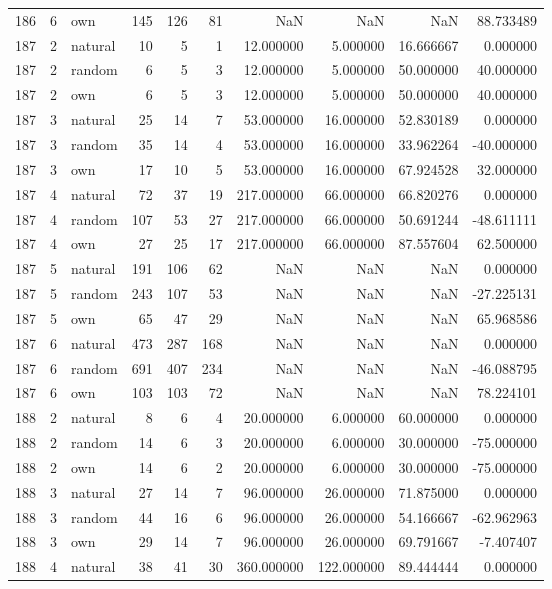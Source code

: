 \begin{table}[htbp]
\begin{tabular}{rrlrrrrrrr}
186 & 6 & own & 145 & 126 & 81 & NaN & NaN & NaN & 88.733489 \\
187 & 2 & natural & 10 & 5 & 1 & 12.000000 & 5.000000 & 16.666667 & 0.000000 \\
187 & 2 & random & 6 & 5 & 3 & 12.000000 & 5.000000 & 50.000000 & 40.000000 \\
187 & 2 & own & 6 & 5 & 3 & 12.000000 & 5.000000 & 50.000000 & 40.000000 \\
187 & 3 & natural & 25 & 14 & 7 & 53.000000 & 16.000000 & 52.830189 & 0.000000 \\
187 & 3 & random & 35 & 14 & 4 & 53.000000 & 16.000000 & 33.962264 & -40.000000 \\
187 & 3 & own & 17 & 10 & 5 & 53.000000 & 16.000000 & 67.924528 & 32.000000 \\
187 & 4 & natural & 72 & 37 & 19 & 217.000000 & 66.000000 & 66.820276 & 0.000000 \\
187 & 4 & random & 107 & 53 & 27 & 217.000000 & 66.000000 & 50.691244 & -48.611111 \\
187 & 4 & own & 27 & 25 & 17 & 217.000000 & 66.000000 & 87.557604 & 62.500000 \\
187 & 5 & natural & 191 & 106 & 62 & NaN & NaN & NaN & 0.000000 \\
187 & 5 & random & 243 & 107 & 53 & NaN & NaN & NaN & -27.225131 \\
187 & 5 & own & 65 & 47 & 29 & NaN & NaN & NaN & 65.968586 \\
187 & 6 & natural & 473 & 287 & 168 & NaN & NaN & NaN & 0.000000 \\
187 & 6 & random & 691 & 407 & 234 & NaN & NaN & NaN & -46.088795 \\
187 & 6 & own & 103 & 103 & 72 & NaN & NaN & NaN & 78.224101 \\
188 & 2 & natural & 8 & 6 & 4 & 20.000000 & 6.000000 & 60.000000 & 0.000000 \\
188 & 2 & random & 14 & 6 & 3 & 20.000000 & 6.000000 & 30.000000 & -75.000000 \\
188 & 2 & own & 14 & 6 & 2 & 20.000000 & 6.000000 & 30.000000 & -75.000000 \\
188 & 3 & natural & 27 & 14 & 7 & 96.000000 & 26.000000 & 71.875000 & 0.000000 \\
188 & 3 & random & 44 & 16 & 6 & 96.000000 & 26.000000 & 54.166667 & -62.962963 \\
188 & 3 & own & 29 & 14 & 7 & 96.000000 & 26.000000 & 69.791667 & -7.407407 \\
188 & 4 & natural & 38 & 41 & 30 & 360.000000 & 122.000000 & 89.444444 & 0.000000 \\

\end{tabular}
\end{table}

